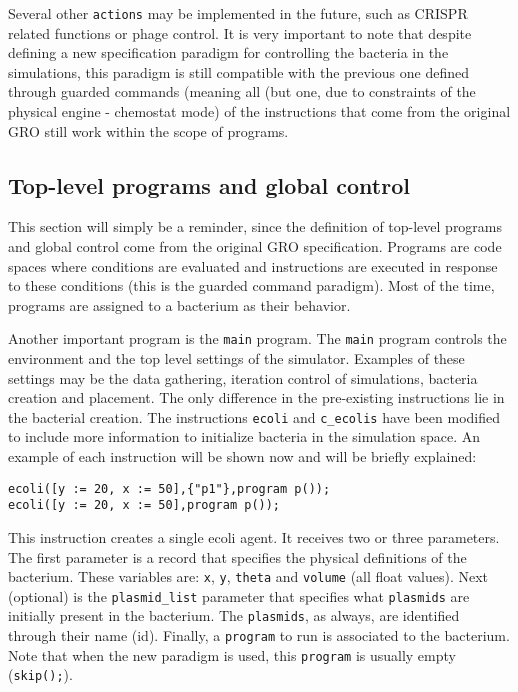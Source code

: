 \documentclass[10pt,a4paper]{article}
\begin{document}
Several other \texttt{actions} may be implemented in the future, such as CRISPR related functions or phage control. It is very important to note that despite defining a new specification paradigm for controlling the bacteria in the simulations, this paradigm is still compatible with the previous one defined through guarded commands (meaning all (but one, due to constraints of the physical engine - chemostat mode) of the instructions that come from the original GRO still work within the scope of programs. \newpage

\subsection{Top-level programs and global control}
This section will simply be a reminder, since the definition of top-level programs and global control come from the original GRO specification.
Programs are code spaces where conditions are evaluated and instructions are executed in response to these conditions (this is the guarded command paradigm). Most of the time, programs are assigned to a bacterium as their behavior. \newline

Another important program is the \texttt{main} program. The \texttt{main} program controls the environment and the top level settings of the simulator. Examples of these settings may be the data gathering, iteration control of simulations, bacteria creation and placement. The only difference in the pre-existing instructions lie in the bacterial creation. The instructions \texttt{ecoli} and \texttt{c\_ecolis} have been modified to include more information to initialize bacteria in the simulation space. An example of each instruction will be shown now and will be briefly explained:

\begin{Verbatim}[obeytabs]
ecoli([y := 20, x := 50],{"p1"},program p());
ecoli([y := 20, x := 50],program p());
\end{Verbatim}

This instruction creates a single ecoli agent. It receives two or three parameters. The first parameter is a record that specifies the physical definitions of the bacterium. These variables are: \texttt{x}, \texttt{y}, \texttt{theta} and \texttt{volume} (all float values). Next (optional) is the \texttt{plasmid\_list} parameter that specifies what \texttt{plasmids} are initially present in the bacterium. The \texttt{plasmids}, as always, are identified through their name (id). Finally, a \texttt{program} to run is associated to the bacterium. Note that when the new paradigm is used, this \texttt{program} is usually empty (\texttt{skip();}).
\end{document}
